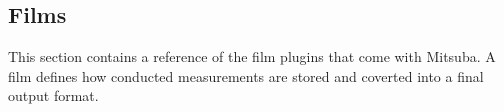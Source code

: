 \newpage
\subsection{Films}
\label{sec:films}
This section contains a reference of the film plugins that come with Mitsuba.
A film defines how conducted measurements are stored and coverted into a 
final output format.
